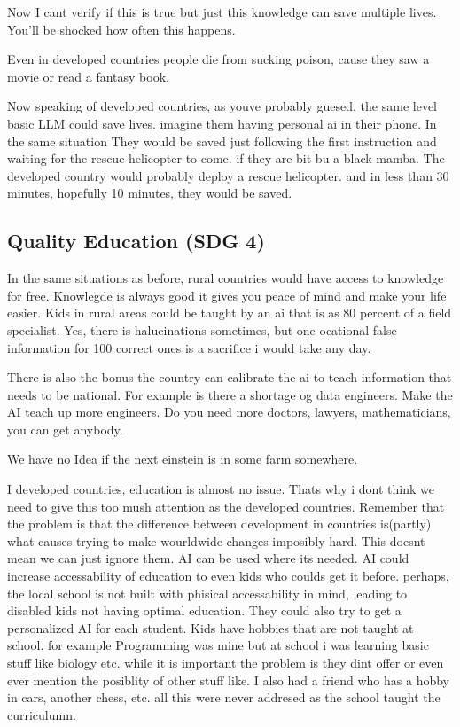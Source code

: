 Now I cant verify if this is true but just this knowledge can save multiple lives. You'll be shocked how often this happens.

Even in developed countries people die from sucking poison, cause they saw a movie or read a fantasy book.

Now speaking of developed countries, as youve probably guesed, the same level basic LLM could save lives. imagine them having personal ai in their phone. In the same situation They would be saved just following the first instruction and waiting for the rescue helicopter to come. if they are bit bu a black mamba. The developed country would probably deploy a rescue helicopter. and in less than 30 minutes, hopefully 10 minutes, they would be saved.


\subsection{Quality Education (SDG 4)}
In the same situations as before, rural countries would have access to knowledge for free. Knowlegde is always good it gives you peace of mind and make your life easier.
Kids in rural areas could be taught by an ai that is as 80 percent of a field specialist. Yes, there is halucinations sometimes, but one ocational false information for 100 correct ones is a sacrifice i would take any day.

There is also the bonus the country can calibrate the ai to teach information that needs to be national. For example is there a shortage og data engineers. Make the AI teach up more engineers. Do you need more doctors, lawyers, mathematicians, you can get anybody. 

We have no Idea if the next einstein is in some farm somewhere.

I developed countries, education is almost no issue. Thats why i dont think we need to give this too mush attention as the developed countries. Remember that the problem is that the difference between development in countries is(partly) what causes trying to make wourldwide changes imposibly hard. This doesnt mean we can just ignore them. AI can be used where its needed. AI could increase accessability of education to even kids who coulds get it before. perhaps, the local school is not built with phisical accessability in mind, leading to disabled kids not having optimal education. They could also try to get a personalized AI for each student. Kids have hobbies that are not taught at school. for example Programming was mine but at school i was learning basic stuff like biology etc. while it is important the problem is they dint offer or even ever mention the posiblity of other stuff like. I also had a friend who has a hobby in cars, another chess, etc. all this were never addresed as the school taught the curriculumn.


